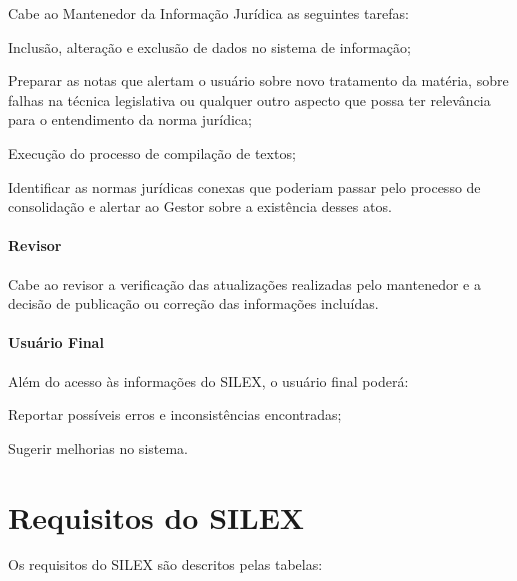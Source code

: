 \documentclass[a4paper,11pt,openright,twoside,english,brazil]{abntex2}
\begin{document}
Cabe ao Mantenedor da Informação Jurídica as seguintes tarefas:

\begin{alineas}
 \item Inclusão, alteração e exclusão de dados no sistema de informação;
 \item Preparar as notas que alertam o usuário sobre novo tratamento da matéria,
 sobre falhas na técnica legislativa ou qualquer outro aspecto que possa ter
 relevância para o entendimento da norma jurídica;
 \item Execução do processo de compilação de textos;
 \item Identificar as normas jurídicas conexas que poderiam passar pelo processo
 de consolidação e alertar ao Gestor sobre a existência desses atos.
\end{alineas}

\subsubsection{Revisor}
\label{sec-papel-revisor}

Cabe ao revisor a verificação das atualizações realizadas pelo mantenedor e a
decisão de publicação ou correção das informações incluídas.

\subsubsection{Usuário Final}
\label{sec-papel-usuario-final}

Além do acesso às informações do SILEX, o usuário final poderá:

\begin{alineas}
 \item Reportar possíveis erros e inconsistências encontradas;
 \item Sugerir melhorias no sistema.
\end{alineas}

\chapter{Requisitos do SILEX}
\label{cap_requisitos}

Os requisitos do SILEX são descritos pelas tabelas:

\silextabelasrequisitos
\end{document}

